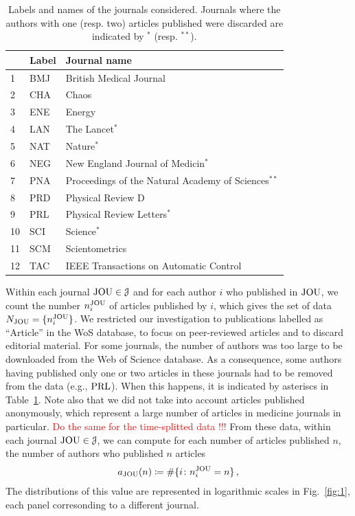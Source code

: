 \documentclass[aps,prl,floatfix,twocolumn]{revtex4-1}
\begin{document}
\begin{table}
 \begin{tabular}{l|l|l}
  & Label & Journal name \\
  \hline
  \hline 1 & BMJ & British Medical Journal \\
  \hline 2 & CHA & Chaos \\
  \hline 3 & ENE & Energy \\
  \hline 4 & LAN & The Lancet$^*$ \\
  \hline 5 & NAT & Nature$^*$ \\
  \hline 6 & NEG & New England Journal of Medicin$^*$ \\
  \hline 7 & PNA & Proceedings of the Natural Academy of Sciences$^{**}$ \\
  \hline 8 & PRD & Physical Review D \\
  \hline 9 & PRL & Physical Review Letters$^*$ \\
  \hline 10 & SCI & Science$^*$ \\
  \hline 11 & SCM & Scientometrics \\
  \hline 12 & TAC & IEEE Transactions on Automatic Control 
 \end{tabular}
 \caption{Labels and names of the journals considered. 
 Journals where the authors with one (resp. two) articles published were discarded are indicated by $^*$ (resp. $^{**}$).}
 \label{tab:journals}
\end{table}

Within each journal ${\rm JOU}\in {\cal J}$ and for each author $i$ who published in ${\rm JOU}$, we count the number $n^{\rm JOU}_i$ of articles published by $i$, which gives the set of data $N_{\rm JOU}=\{n^{\rm JOU}_i\}$. 
We restricted our investigation to publications labelled as ``Article'' in the WoS database, to focus on peer-reviewed articles and to discard editorial material. 
For some journals, the number of authors was too large to be downloaded from the Web of Science database. 
As a consequence, some authors having published only one or two articles in these journals had to be removed from the data (e.g., ${\rm PRL}$). 
When this happens, it is indicated by asteriscs in Table~\ref{tab:journals}.
Note also that we did not take into account articles published anonymously, which represent a large number of articles in medicine journals in particular. 
\textcolor{red}{Do the same for the time-splitted data !!!}
From these data, within each journal ${\rm JOU}\in{\cal J}$, we can compute for each number of articles published $n$, the number of authors who published $n$ articles 
\begin{align}
 a_{\rm JOU}(n)\coloneqq\#\{i\colon n^{\rm JOU}_i = n\}\, ,
\end{align}
The distributions of this value are represented in logarithmic scales in Fig.~\ref{fig:1}, each panel corresonding to a different journal. 
\end{document}
